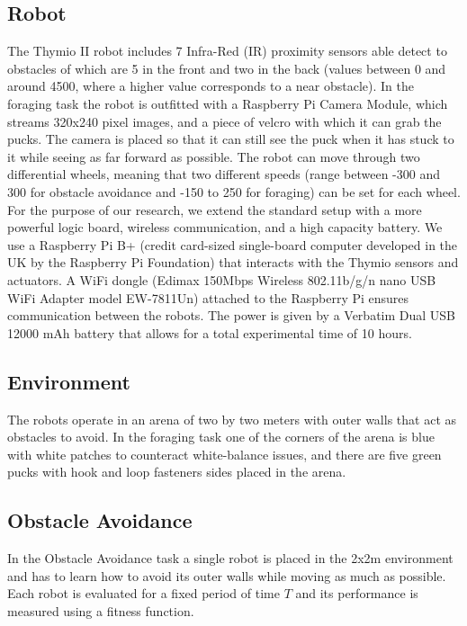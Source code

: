 \documentclass{article}
\begin{document}
	\subsection{Robot} %
	\label{sub:Robot}
	The Thymio II robot includes 7 Infra-Red (IR) proximity sensors able detect
	to obstacles of which are 5 in the front and two in the back (values
	between 0 and around 4500, where a higher value corresponds to a near
	obstacle).
	In the foraging task the robot is outfitted with a Raspberry Pi Camera
	Module, which streams 320x240 pixel images, and a piece of velcro with
	which it can grab the pucks. The camera is placed so that it can still see
	the puck when it has stuck to it while seeing as far forward as possible.
	The robot can move through two differential wheels, meaning that two
	different speeds (range between -300 and 300 for obstacle avoidance and
	-150 to 250 for foraging) can be set for each wheel. For the purpose of our
	research, we extend the standard setup with a more powerful logic board,
	wireless communication, and a high capacity battery. We use a Raspberry Pi
	B+ (credit card-sized single-board computer developed in the UK by the
	Raspberry Pi Foundation) that interacts with the Thymio sensors and
	actuators. A WiFi dongle (Edimax 150Mbps Wireless 802.11b/g/n nano USB WiFi
	Adapter model EW-7811Un) attached to the Raspberry Pi ensures communication
	between the robots. The power is given by a Verbatim Dual USB 12000 mAh
	battery that allows for a total experimental time of 10 hours.

	\subsection{Environment} %
	\label{sub:Environment}
	The robots operate in an arena of two by two meters with outer walls that
	act as obstacles to avoid.
	In the foraging task one of the corners of the arena is blue with white
	patches to counteract white-balance issues, and there are five green pucks
	with hook and loop fasteners sides placed in the arena.

	\subsection{Obstacle Avoidance} %
	\label{sub:Obstacle Avoidance}
	In the Obstacle Avoidance task a single robot is placed in the
	2x2m environment and has to learn how to avoid its outer walls while moving
	as much as possible. Each robot is evaluated for a fixed period of time $T$
	and its performance is measured using a fitness function.
\end{document}
